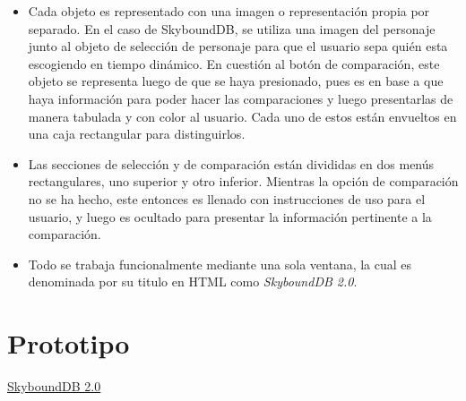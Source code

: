 \begin{itemize}
\begin{itemize}
    \end{itemize}
    \item Cada objeto es representado con una imagen o representación propia por separado. En el caso de SkyboundDB, se utiliza una imagen del personaje junto al objeto de selección de personaje para que el usuario sepa quién esta escogiendo en tiempo dinámico. En cuestión al botón de comparación, este objeto se representa luego de que se haya presionado, pues es en base a que haya información para poder hacer las comparaciones y luego presentarlas de manera tabulada y con color al usuario. Cada uno de estos están envueltos en una caja rectangular para distinguirlos.
    \item Las secciones de selección y de comparación están divididas en dos menús rectangulares, uno superior y otro inferior. Mientras la opción de comparación no se ha hecho, este entonces es llenado con instrucciones de uso para el usuario, y luego es ocultado para presentar la información pertinente a la comparación.
    \item Todo se trabaja funcionalmente mediante una sola ventana, la cual es denominada por su titulo en HTML como \textit{SkyboundDB 2.0}.
\end{itemize}





\section{Prototipo}



\href{https://aramis-matos.github.io/skyboundDB2.0/}{SkyboundDB 2.0}

